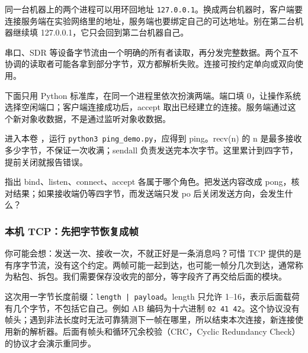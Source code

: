 同一台机器上的两个进程可以用环回地址 \nolinkurl{127.0.0.1}。换成两台机器时，客户端要连接服务端在实验网络里的地址，服务端也要绑定自己的可达地址。别在第二台机器继续填 127.0.0.1，它只会回到第二台机器自己。
\begin{note}
串口、SDR 等设备字节流由一个明确的所有者读取，再分发完整数据。两个互不协调的读取者可能各拿到部分字节，双方都解析失败。连接可按约定单向或双向使用。
\end{note}
\begin{example}[先用四个字节认识连接]
下面只用 Python 标准库，在同一个进程里依次扮演两端。端口填 0，让操作系统选择空闲端口；客户端连接成功后，accept 取出已经建立的连接。服务端通过这个新对象收数据，不是通过监听对象收数据。
\begin{commcode}

\end{commcode}
进入本卷 ，运行 \texttt{python3 ping\_demo.py}，应得到 ping。recv(n) 的 n 是最多接收多少字节，不保证一次收满；sendall 负责发送完本次字节。这里累计到四字节，提前关闭就报告错误。
\end{example}
\begin{exercise}\label{ex:v2-comm-roles}
指出 bind、listen、connect、accept 各属于哪个角色。把发送内容改成 pong，核对结果；如果接收端仍等四字节，而发送端只发 po 后关闭发送方向，会发生什么？
\end{exercise}

\subsubsection{本机 TCP：先把字节恢复成帧}
你可能会想：发送一次、接收一次，不就正好是一条消息吗？可惜 TCP 提供的是有序字节流，没有这个约定。两帧可能一起到达，也可能一帧分几次到达，通常称为粘包、拆包。我们需要保存没收完的部分，等字段齐了再交给后面的模块。

这次用一字节长度前缀：\texttt{length | payload}。length 只允许 1--16，表示后面载荷有几个字节，不包括它自己。例如 AB 编码为十六进制 \texttt{02 41 42}。这个协议没有帧头；遇到非法长度时无法可靠猜测下一帧在哪里，所以结束本次连接，新连接使用新的解析器。后面有帧头和循环冗余校验（CRC，Cyclic Redundancy Check）的协议才会演示重同步。

